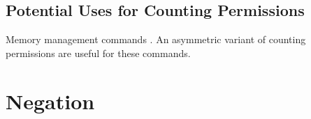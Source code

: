 \documentclass[11pt]{report}
\begin{document}

  










 

\subsection{Potential Uses for Counting Permissions}

Memory management commands \cite{wmsldetails,lola11}. An asymmetric variant of counting permissions are useful for these commands. 

\section{Negation}
    
\end{document}
